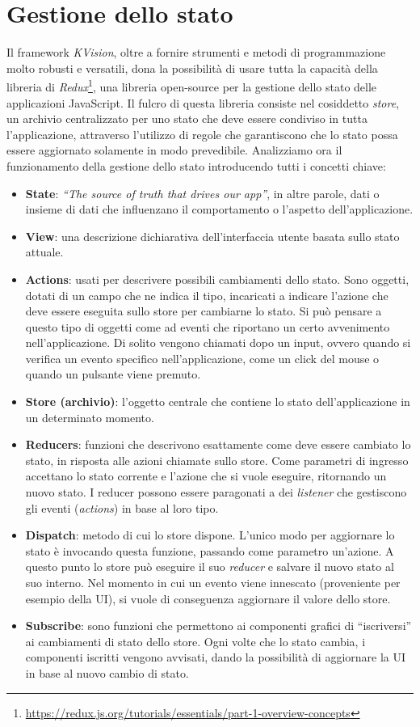 \section{Gestione dello stato}\label{section:state-management}
Il framework \textit{KVision}, oltre a fornire strumenti e metodi di programmazione molto robusti e versatili, dona la possibilità di usare tutta la capacità della libreria di \textit{Redux}\footnote{\url{https://redux.js.org/tutorials/essentials/part-1-overview-concepts}}, una libreria open-source per la gestione dello stato delle applicazioni JavaScript. Il fulcro di questa libreria consiste nel cosiddetto \textit{store}, un archivio centralizzato per uno stato che deve essere condiviso in tutta l'applicazione, attraverso l'utilizzo di regole che garantiscono che lo stato possa essere aggiornato solamente in modo prevedibile. Analizziamo ora il funzionamento della gestione dello stato introducendo tutti i concetti chiave: 
\begin{itemize}	
	\item \textbf{State}: \textit{``The source of truth that drives our app''}, in altre parole, dati o insieme di dati che influenzano il comportamento o l'aspetto dell'applicazione. 	
	\item \textbf{View}: una descrizione dichiarativa dell'interfaccia utente basata sullo stato attuale.
	\item \textbf{Actions}: usati per descrivere possibili cambiamenti dello stato. Sono oggetti, dotati di un campo che ne indica il tipo, incaricati a indicare l'azione che deve essere eseguita sullo store per cambiarne lo stato. Si può pensare a questo tipo di oggetti come ad eventi che riportano un certo avvenimento nell'applicazione. Di solito vengono chiamati dopo un input, ovvero quando si verifica un evento specifico nell'applicazione, come un click del mouse o quando un pulsante viene premuto.
	\item \textbf{Store (archivio)}: l'oggetto centrale che contiene lo stato dell'applicazione in un determinato momento.
	\item \textbf{Reducers}: funzioni che descrivono esattamente come deve essere cambiato lo stato, in risposta alle azioni chiamate sullo store. Come parametri di ingresso accettano lo stato corrente e l'azione che si vuole eseguire, ritornando un nuovo stato. I reducer possono essere paragonati a dei \textit{listener} che gestiscono gli eventi (\textit{actions}) in base al loro tipo.
	\item \textbf{Dispatch}: metodo di cui lo store dispone. L'unico modo per aggiornare lo stato è invocando questa funzione, passando come parametro un'azione.  A questo punto lo store può eseguire il suo \textit{reducer} e salvare il nuovo stato al suo interno. Nel momento in cui un evento viene innescato (proveniente per esempio della \ac{UI}), si vuole di conseguenza aggiornare il valore dello store.
	\item \textbf{Subscribe}: sono funzioni che permettono ai componenti grafici di ``iscriversi'' ai cambiamenti di stato dello store. Ogni volte che lo stato cambia, i componenti iscritti vengono avvisati, dando la possibilità di aggiornare la \ac{UI} in base al nuovo cambio di stato.
\end{itemize}
